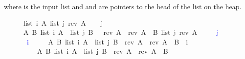 \documentclass[twoside,runningheads,envcountsame,envcountsect,oribibl,orivec]{llncs}
\begin{document}
where  is the input list and  and  are pointers to the head of the list
on the heap.

\begin{figure}
\begin{isabellebody}
\isanewline

{\isasymlbrakk}
	list\ {\isacharbackquote}i\ A{\isacharcomma}\ 
	list\ {\isacharbackquote}j\ {\isacharparenleft}rev\ A{\isacharparenright}
{\isasymrbrakk}
\isanewline\ \ \ {\isasymsqsubseteq}\hfill \isanewline
{\isacharbackquote}j\ {\isacharcolon}{\isacharequal}\ {}{\isacharsemicolon}\ 
\isanewline
{\isasymlbrakk}
	A\ B{\isachardot}\ {\isacharparenleft}list\ {\isacharbackquote}i\ A\ {\isacharasterisk}\ list\ {\isacharbackquote}j\ B\ {\isacharparenright}\ \ {\isacharparenleft}rev\ A{\isacharparenright}\ {\isacharequal}\ {\isacharparenleft}rev\ A{\isacharparenright}\ {\isacharat}\ B{\isacharcomma}\ 
list\ {\isacharbackquote}j\ {\isacharparenleft}rev\ A{\isacharparenright}\ {\isasymrbrakk}\ 
\isanewline\ \ \ {\isasymsqsubseteq}\hfill \isanewline
\textcolor{blue}{{\isacharbackquote}j\ {\isacharcolon}{\isacharequal}\ {}{\isacharsemicolon}}\isanewline
\textcolor{blue}{\ {\isacharbackquote}i\ {\isasymnoteq}\ {\isadigit{0}}\ }\isanewline
\ \ {\isasymlbrakk}{\isacharparenleft}A\ B{\isachardot}\ {\isacharparenleft}list\ {\isacharbackquote}i\ A\ {\isacharasterisk}\ list\ {\isacharbackquote}j\ B{\isacharparenright}\ \ {\isacharparenleft}rev\ A{\isacharparenright}\ {\isacharequal}\ {\isacharparenleft}rev\ A{\isacharparenright}\ {\isacharat}\ B{\isacharparenright}\ \ {\isacharbackquote}i\ {\isasymnoteq}\ {}{\isacharcomma}\ \isanewline
\ \ \ \ A\ B{\isachardot}\ {\isacharparenleft}list\ {\isacharbackquote}i\ A\ {\isacharasterisk}\ list\ {\isacharbackquote}j\ B{\isacharparenright}\ \ {\isacharparenleft}rev\ A{\isacharparenright}\ {\isacharequal}\ {\isacharparenleft}rev\ A{\isacharparenright}\ {\isacharat}\ B\ {\isasymrbrakk}\isanewline
\textcolor{blue}{}\

\isanewline 


\end{isabellebody}
\end{figure}
\end{document}
